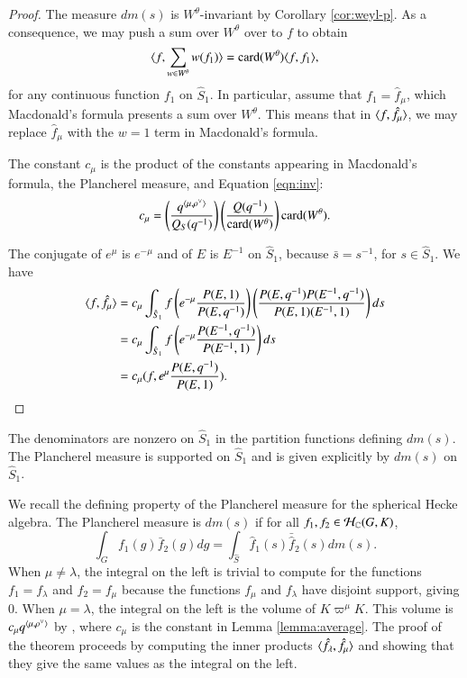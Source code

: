 \begin{proof}  
The  measure $dm(s)$ is $W^\theta$-invariant by Corollary \ref{cor:weyl-p}.  As a consequence,
we may push a sum over $W^\theta$ over to $f$ to obtain
\begin{equation}\label{eqn:inv}
\langle{f,\sum_{w\in W^\theta} w(f_1)}\rangle = {\operatorname{card}}(W^\theta)\langle{f,f_1}\rangle,
\end{equation}
for any continuous function $f_1$ on $\hat S_1$.
In particular, assume that $f_1=\hat f_\mu$, which Macdonald's
formula presents a sum over $W^\theta$.
This means that in $\langle{f,\hat f_\mu}\rangle$, we may replace 
$\hat f_\mu$  with
the $w=1$ term  in Macdonald's formula.

The constant $c_\mu$ is the product of the constants appearing in Macdonald's formula, the Plancherel measure,
and Equation \ref{eqn:inv}:
\[
c_\mu = \left(\frac{q^{\langle{\mu,\rho^\vee}\rangle}}{Q_S(q^{-1})}\right)\left(\frac{Q(q^{-1})}{{\operatorname{card}}(W^\theta)}\right) {\operatorname{card}}(W^\theta).
\]

The conjugate of $e^\mu$ is $e^{-\mu}$ and of $E$ is $E^{-1}$ on $\hat S_1$, because $\bar s = s^{-1}$, for $s\in \hat S_1$.
We have
\begin{align*}
\langle{f,\hat f_\mu}\rangle &=
c_\mu\int_{\hat S_1} f \left(e^{-\mu} \frac{P(E,1)}{P(E,q^{-1})}\right) \left(\frac{P(E,q^{-1}) P(E^{-1},q^{-1})}{P(E,1)(E^{-1},1)}\right) ds\\
&=
c_\mu\int_{\hat S_1} f \left(e^{-\mu} \frac{P(E^{-1},q^{-1})}{P(E^{-1},1)}\right) ds\\
&=
c_\mu (f, e^\mu\frac{ P(E,q^{-1})}{P(E,1)}).
\end{align*}
\end{proof}

\begin{theorem}
The denominators are nonzero on $\hat S_1$ in the partition functions defining 
$dm(s)$. 
The Plancherel measure is supported on $\hat S_1$ and is given explicitly by $dm(s)$ on $\hat S_1$.
\end{theorem}

\begin{remark}
We recall the defining property of the Plancherel measure
for the spherical Hecke algebra.  The Plancherel measure  is $dm(s)$  if
for all $f_1,f_2\in \mathcal H_{\mathbb{C}}(G,K)$,
\[
\int_G f_1(g) \bar f_2 (g) dg = \int_{\hat S} \hat f_1(s) \bar {\hat f}_2 (s) dm(s).
\]
When $\mu\ne\lambda$,
the integral on the left is trivial to compute for the functions $f_1 = f_\lambda$ and $f_2 = f_\mu$
because the functions $f_\mu$ and $f_\lambda$ have disjoint support, giving $0$.
When $\mu=\lambda$, the integral on the left is the volume of $K\varpi^\mu K$.
This volume is $c_\mu q^{\langle{\mu,\rho^\vee}\rangle}$ by \cite{casselman2005companion}, where $c_\mu$ is
the constant in Lemma \ref{lemma:average}.
The proof of the theorem proceeds by computing the inner products $\langle{\hat f_\lambda,\hat f_\mu}\rangle$
and showing that they give the same values as the integral on the left.
\end{remark}

